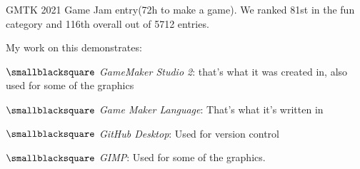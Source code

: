 \documentclass[10mm,letterpaper,notitlepage]{article}
\begin{document}
			{\color[RGB]{108, 29, 169}
			\fontsize{4.5mm}{6.0mm}\selectfont
				\setlength{\parindent}{\parindent+4mm}
				
				\nopagebreak
						{\color[RGB]{87, 135, 199}
						\fontsize{9.0mm}{12.0mm}\selectfont
						\par}
					\setlength{\parindent}{\parindent+4mm}
					
					\nopagebreak
							{\color[RGB]{0, 0, 0}
							\fontsize{2.25mm}{3.0mm}\selectfont
									{\color[RGB]{108, 29, 169}
									\fontsize{4.5mm}{6.0mm}\selectfont
									\color[RGB]{105, 58, 174}{{ }}
									\par}
							GMTK 2021 Game Jam entry(72h to make a game). We ranked 81st in the fun category and 116th overall out of 5712 entries.
							
							My work on this demonstrates:
								\setlength{\parindent}{\parindent+4mm}
								
								\nopagebreak
								$\smallblacksquare$ \textit{GameMaker Studio 2}: that's what it was created in, also used for some of the graphics
								
								$\smallblacksquare$ \textit{Game Maker Language}: That's what it's written in
								
								$\smallblacksquare$ \textit{GitHub Desktop}: Used for version control
								
								$\smallblacksquare$ \textit{GIMP}: Used for some of the graphics.
								
}}
\end{document}
